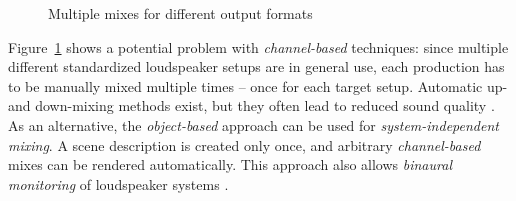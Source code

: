 \begin{figure}[htbp]
\centering
{}
\caption{Multiple mixes for different output formats}
\label{fig:multiple-mixes}
\end{figure}

Figure~\ref{fig:multiple-mixes}
shows a potential problem with \emph{channel-based} techniques:
since multiple different standardized loudspeaker setups are in general use,
each production has to be manually mixed multiple times
-- once for each target setup.
Automatic up- and down-mixing methods exist,
but they often lead to reduced sound quality
\parencite{zielinski2003effects,vilkamo2014reduction,avendano2004frequency-domain,faller2006multiple-loudspeaker}.
As an alternative,
the \emph{object-based} approach can be used for
\emph{system-independent mixing}.
A scene description is created only once,
and arbitrary \emph{channel-based} mixes
can be rendered automatically.
This approach also allows \emph{binaural monitoring} of loudspeaker systems
\parencite{geier2009binaural}.

